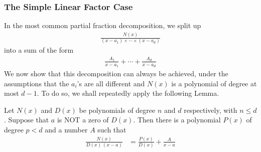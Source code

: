 \subsubsection*{The Simple Linear Factor Case}
In the most common partial fraction decomposition, we split up
\begin{align*}
\frac{N(x)}{(x-a_1)\times\cdots\times (x-a_d)}
\end{align*}
into a sum of the form
\begin{align*}
\frac{A_1}{x-a_1}+\cdots+\frac{A_d}{x-a_d}
\end{align*}
We now show that this decomposition can always be achieved, under the
assumptions that the $a_i$'s are all different and  $N(x)$ is a polynomial
of degree at most $d-1$. To do so, we shall repeatedly apply
the following Lemma.
\begin{lemma}\label{lem:PFa}
Let $N(x)$ and $D(x)$ be polynomials of degree $n$ and $d$ respectively,
with $n\le d$. Suppose that $a$ is NOT a zero of $D(x)$. Then there
is a polynomial $P(x)$ of degree $p<d$ and a number $A$ such that
\begin{align*}
\frac{N(x)}{D(x)\,(x-a)}
&=\frac{P(x)}{D(x)}+\frac{A}{x-a}
\end{align*}
\end{lemma}
